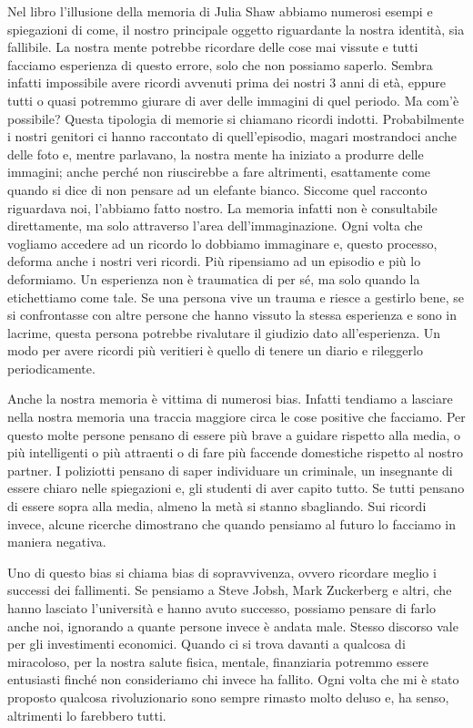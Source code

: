 \documentclass[12pt]{book} %
\begin{document}
\begin{mdframed}[linewidth=1pt]
Nel libro l'illusione della memoria di Julia Shaw abbiamo numerosi esempi
e spiegazioni di come, il nostro principale oggetto riguardante la nostra identità, sia fallibile. La nostra mente
potrebbe ricordare delle cose mai vissute e tutti facciamo esperienza di questo errore, solo che non possiamo saperlo.
Sembra infatti impossibile avere ricordi avvenuti prima dei nostri 3 anni di età, eppure tutti o quasi potremmo giurare
di aver delle immagini di quel periodo. Ma com'è possibile? Questa tipologia di memorie si
chiamano ricordi indotti. Probabilmente i nostri genitori ci hanno raccontato di quell'episodio,
magari mostrandoci anche delle foto e, mentre parlavano, la nostra mente ha iniziato a produrre delle immagini; anche
perché non riuscirebbe a fare altrimenti, esattamente come quando si dice di non pensare ad un elefante bianco. Siccome
quel racconto riguardava noi, l'abbiamo fatto nostro. La memoria infatti non è consultabile
direttamente, ma solo attraverso l'area dell'immaginazione. Ogni volta che
vogliamo accedere ad un ricordo lo dobbiamo immaginare e, questo processo, deforma anche i nostri veri ricordi. Più
ripensiamo ad un episodio e più lo deformiamo. Un esperienza non è traumatica di per sé, ma solo quando la etichettiamo
come tale. Se una persona vive un trauma e riesce a gestirlo bene, se si confrontasse con altre persone che hanno
vissuto la stessa esperienza e sono in lacrime, questa persona potrebbe rivalutare il giudizio dato all'esperienza. Un
modo per avere ricordi più veritieri è quello di tenere un diario e rileggerlo periodicamente.

Anche la nostra memoria è vittima di numerosi bias. Infatti tendiamo a lasciare nella nostra memoria una traccia
maggiore circa le cose positive che facciamo. Per questo molte persone pensano di essere più brave a guidare rispetto
alla media, o più intelligenti o più attraenti o di fare più faccende domestiche rispetto al nostro partner. I
poliziotti pensano di saper individuare un criminale, un insegnante di essere chiaro nelle spiegazioni e, gli studenti
di aver capito tutto. 
Se tutti pensano di essere sopra alla media, almeno la metà si stanno sbagliando.
Sui ricordi invece, alcune ricerche dimostrano che quando pensiamo al futuro lo facciamo in maniera negativa.

Uno di questo bias si chiama bias di sopravvivenza, ovvero ricordare meglio i successi dei fallimenti. Se pensiamo a
Steve Jobsh, Mark Zuckerberg e altri, che hanno lasciato l'università e hanno avuto successo, possiamo pensare di farlo
anche noi, ignorando a quante persone invece è andata male. Stesso discorso vale per gli investimenti economici. Quando
ci si trova davanti a qualcosa di miracoloso, per la nostra salute fisica, mentale, finanziaria potremmo essere
entusiasti finché non consideriamo chi invece ha fallito. Ogni volta che mi è stato proposto qualcosa
rivoluzionario sono sempre rimasto molto deluso e, ha senso, altrimenti lo farebbero tutti.


\end{mdframed}
\end{document}
